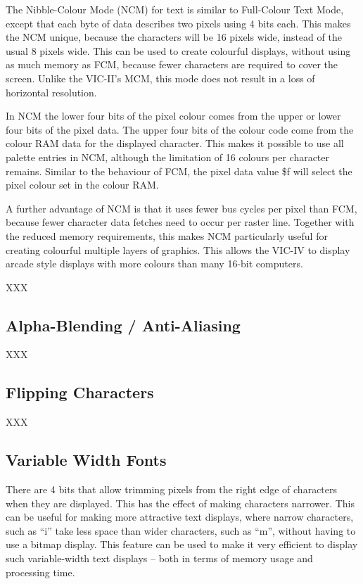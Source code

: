 The Nibble-Colour Mode (NCM) for text is similar to Full-Colour Text Mode, except that each byte of data describes two
pixels using 4 bits each. This makes the NCM unique, because the characters will be 16 pixels wide, instead of the usual 8 pixels wide. This can be used to create colourful displays, without using as much memory as FCM, because fewer characters are required to cover the screen.  Unlike the VIC-II's MCM, this mode does not result in a loss of horizontal resolution.

In NCM the lower four bits of the pixel colour comes from the upper or lower four bits of the pixel data.  The upper four bits of the colour code come from the colour RAM data for the displayed character.  This makes it possible to use all palette entries in NCM, although the limitation of 16 colours per character remains. Similar to the behaviour of FCM, the pixel data value \$f will select the pixel colour set in the colour RAM.

A further advantage of NCM is that it uses fewer bus cycles per pixel than FCM, because fewer character data fetches need to occur per raster line.  Together with the reduced memory requirements, this makes NCM particularly useful for creating colourful multiple layers of graphics.  This allows the VIC-IV to display arcade style displays with more colours than many 16-bit computers.


XXX

\subsection{Alpha-Blending / Anti-Aliasing}

XXX

\subsection{Flipping Characters}

XXX

\subsection{Variable Width Fonts}

There are 4 bits that allow trimming pixels from the right edge of characters when they are displayed. This has the effect of making
characters narrower. This can be useful for making more attractive text displays, where narrow characters, such as ``i'' take less space than wider characters, such as ``m'', without having to use a bitmap display. This feature can be used to make it very efficient to display
such variable-width text displays -- both in terms of memory usage and processing time.

